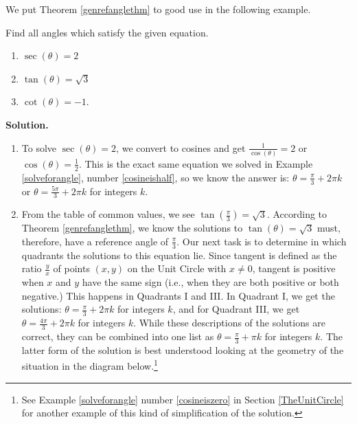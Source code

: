 \smallskip

We put Theorem \ref{genrefanglethm} to good use in the following example.

\begin{ex}  \label{solveforangle2}  Find all angles which satisfy the given equation.   

\begin{multicols}{3}

\begin{enumerate}

\item  $\sec(\theta) =2$

\item  $\tan(\theta) = \sqrt{3}$

\item  \label{cotangentisnegativeone} $\cot(\theta) = -1$.

\end{enumerate}

\end{multicols}

{\bf Solution.}

\begin{enumerate}

\item  To solve $\sec(\theta) = 2$, we convert to cosines and get $\frac{1}{\cos(\theta)} = 2$ or $\cos(\theta) = \frac{1}{2}$.  This is the exact same equation we solved in Example \ref{solveforangle}, number \ref{cosineishalf}, so we know the answer is:  $\theta = \frac{\pi}{3} + 2\pi k$ or $\theta = \frac{5\pi}{3} + 2\pi k$ for integers $k$.

\item From the table of common values, we see  $\tan\left(\frac{\pi}{3}\right) = \sqrt{3}$.  According to Theorem \ref{genrefanglethm}, we  know  the solutions to $\tan(\theta) = \sqrt{3}$ must, therefore, have a reference angle of $\frac{\pi}{3}$. Our next task is to determine in which quadrants the solutions to this equation lie. Since tangent is defined as the ratio $\frac{y}{x}$ of points $(x,y)$ on the Unit Circle with $x \neq 0$, tangent is positive when $x$ and $y$ have the same sign (i.e., when they are both positive or both negative.)  This happens in Quadrants I and III.  In Quadrant I, we get the solutions: $\theta = \frac{\pi}{3} + 2\pi k$ for integers $k$, and for Quadrant III, we get $\theta = \frac{4\pi}{3} + 2\pi k$ for integers $k$.  While these descriptions of the solutions are correct, they can be combined into one list as $\theta = \frac{\pi}{3} + \pi k$ for integers $k$. The latter form of the solution is best understood looking at the geometry of the situation in the diagram below.\footnote{See Example \ref{solveforangle} number \ref{cosineiszero} in Section \ref{TheUnitCircle} for another example of this kind of simplification of the solution.}
 


\end{enumerate}
\end{ex}
